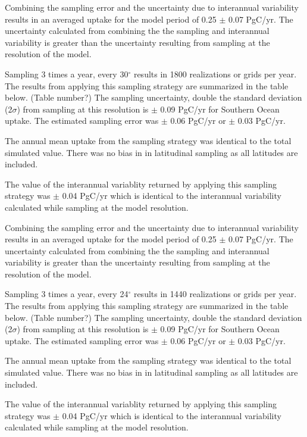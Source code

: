 \documentclass[11pt, a4paper]{article}
\numberwithin{figure}{section}
\numberwithin{table}{section}
\begin{document}
Combining the sampling error and the uncertainty due to interannual
variability results in an averaged uptake for the model period of 
0.25 $\pm$ 0.07 PgC/yr.
The uncertainty calculated from combining the the sampling and 
interannual variability is greater than the uncertainty resulting from
sampling at the resolution of the model.


Sampling 3 times a year, every 30$^{\circ}$ results in 1800 realizations 
or grids per year. The results from applying this sampling strategy are
summarized in the table below. (Table number?)
The sampling uncertainty, double the standard deviation (2$\sigma$) 
from sampling at this resolution is
$\pm$ 0.09 PgC/yr for Southern Ocean uptake.
The estimated sampling error was 
$\pm$ 0.06 PgC/yr or $\pm$ 0.03 PgC/yr.

The annual mean uptake from the sampling strategy was identical to 
the total simulated value. There was no bias in in latitudinal sampling
as all latitudes are included.

The value of the interannual variablity returned by applying this
sampling strategy was $\pm$ 0.04 PgC/yr which is identical to the 
interannual variability calculated while sampling at the model 
resolution. 

Combining the sampling error and the uncertainty due to interannual
variability results in an averaged uptake for the model period of 
0.25 $\pm$ 0.07 PgC/yr.
The uncertainty calculated from combining the the sampling and 
interannual variability is greater than the uncertainty resulting from
sampling at the resolution of the model.


Sampling 3 times a year, every 24$^{\circ}$ results in 1440 realizations 
or grids per year. The results from applying this sampling strategy are
summarized in the table below. (Table number?)
The sampling uncertainty, double the standard deviation (2$\sigma$) 
from sampling at this resolution is
$\pm$ 0.09 PgC/yr for Southern Ocean uptake.
The estimated sampling error was 
$\pm$ 0.06 PgC/yr or $\pm$ 0.03 PgC/yr.

The annual mean uptake from the sampling strategy was identical to 
the total simulated value. There was no bias in in latitudinal sampling
as all latitudes are included.

The value of the interannual variablity returned by applying this
sampling strategy was $\pm$ 0.04 PgC/yr which is identical to the 
interannual variability calculated while sampling at the model 
resolution. 
\end{document}
